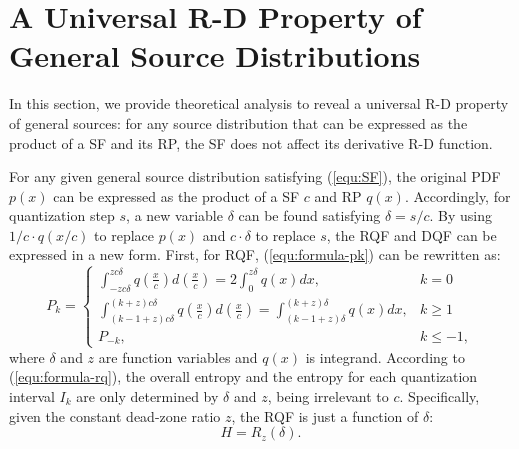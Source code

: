 \documentclass[smallabstract,smallcaptions]{dccpaper}
\begin{document}
\section{A Universal R-D Property of General Source Distributions}
In this section, we provide theoretical analysis to reveal a universal R-D property of general sources: for any source distribution that can be expressed as the product of a SF and its RP, the SF does not affect its derivative R-D function.

For any given general source distribution satisfying (\ref{equ:SF}), the original PDF $p(x)$ can be expressed as the product of a SF $c$ and RP $q(x)$. Accordingly, for quantization step $s$, a new variable $\delta$ can be found satisfying $\delta = s/c$. By using $1/c \cdot q(x/c)$ to replace $p(x)$ and $c \cdot \delta$ to replace $s$, the RQF and DQF can be expressed in a new form. First, for RQF, (\ref{equ:formula-pk}) can be rewritten as:
\begin{equation}\label{equ:formula-pknew}
	P_k =
	\begin{cases}
		\int_{-z c\delta}^{z c\delta} q\left(\frac{x}{c}\right) d\left(\frac{x}{c}\right)
		= 2 \int_{0}^{z \delta} q(x) dx,
		& k=0 \\
		\int_{(k-1+z) c\delta}^{(k+z) c\delta} q\left(\frac{x}{c}\right) d\left(\frac{x}{c}\right)
		=\int_{(k-1+z) \delta}^{(k+z) \delta} q(x) dx,
		& k \ge 1 \\
		P_{-k},
		& k \le -1 ,
	\end{cases}
\end{equation} 
where $\delta$ and $z$ are function variables and $q(x)$ is integrand. According to (\ref{equ:formula-rq}), the overall entropy and the entropy for each quantization interval $I_k$ are only determined by $\delta$ and $z$, being irrelevant to $c$. Specifically, given the constant dead-zone ratio $z$, the RQF is just a function of $\delta$: 
\begin{equation}\label{equ:formula-rqnew}
	H = R_z(\delta).
\end{equation}
\end{document}

